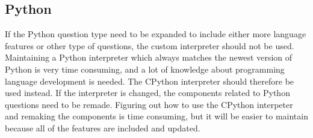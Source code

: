 \subsection{Python}
If the Python question type need to be expanded to include either more language features or other type of questions, the custom interpreter should not be used. Maintaining a Python interpreter which always matches the newest version of Python is very time consuming, and a lot of knowledge about programming language development is needed. The CPython interpreter should therefore be used instead. If the interpreter is changed, the components related to Python questions need to be remade. Figuring out how to use the CPython interpeter and remaking the components is time consuming, but it will be easier to maintain because all of the features are included and updated.